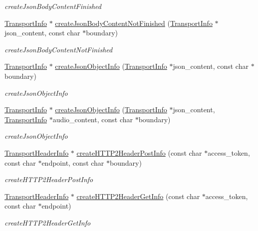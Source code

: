 \begin{DoxyCompactItemize}
\begin{DoxyCompactList}\small\item\em create\+Json\+Body\+Content\+Finished \end{DoxyCompactList}\item 
\hyperlink{classAlexaEvent_1_1TransportInfo}{Transport\+Info} $\ast$ \hyperlink{classAlexaEvent_1_1TransportMaker_a77baa31d47b9c6eff88b8499660752bf}{create\+Json\+Body\+Content\+Not\+Finished} (\hyperlink{classAlexaEvent_1_1TransportInfo}{Transport\+Info} $\ast$json\+\_\+content, const char $\ast$boundary)
\begin{DoxyCompactList}\small\item\em create\+Json\+Body\+Content\+Not\+Finished \end{DoxyCompactList}\item 
\hyperlink{classAlexaEvent_1_1TransportInfo}{Transport\+Info} $\ast$ \hyperlink{classAlexaEvent_1_1TransportMaker_a0ea3c7a006bcd8e69808438c3e860597}{create\+Json\+Object\+Info} (\hyperlink{classAlexaEvent_1_1TransportInfo}{Transport\+Info} $\ast$json\+\_\+content, const char $\ast$boundary)
\begin{DoxyCompactList}\small\item\em create\+Json\+Object\+Info \end{DoxyCompactList}\item 
\hyperlink{classAlexaEvent_1_1TransportInfo}{Transport\+Info} $\ast$ \hyperlink{classAlexaEvent_1_1TransportMaker_a6c5d565390aa7b1be80859cd0cb5b7bb}{create\+Json\+Object\+Info} (\hyperlink{classAlexaEvent_1_1TransportInfo}{Transport\+Info} $\ast$json\+\_\+content, \hyperlink{classAlexaEvent_1_1TransportInfo}{Transport\+Info} $\ast$audio\+\_\+content, const char $\ast$boundary)
\begin{DoxyCompactList}\small\item\em create\+Json\+Object\+Info \end{DoxyCompactList}\item 
\hyperlink{classAlexaEvent_1_1TransportHeaderInfo}{Transport\+Header\+Info} $\ast$ \hyperlink{classAlexaEvent_1_1TransportMaker_ab6d4564a95177c10e341a13938b256a8}{create\+H\+T\+T\+P2\+Header\+Post\+Info} (const char $\ast$access\+\_\+token, const char $\ast$endpoint, const char $\ast$boundary)
\begin{DoxyCompactList}\small\item\em create\+H\+T\+T\+P2\+Header\+Post\+Info \end{DoxyCompactList}\item 
\hyperlink{classAlexaEvent_1_1TransportHeaderInfo}{Transport\+Header\+Info} $\ast$ \hyperlink{classAlexaEvent_1_1TransportMaker_a1ec78cac69e3243b492fcdafcc21a7fb}{create\+H\+T\+T\+P2\+Header\+Get\+Info} (const char $\ast$access\+\_\+token, const char $\ast$endpoint)
\begin{DoxyCompactList}\small\item\em create\+H\+T\+T\+P2\+Header\+Get\+Info \end{DoxyCompactList}\end{DoxyCompactItemize}


